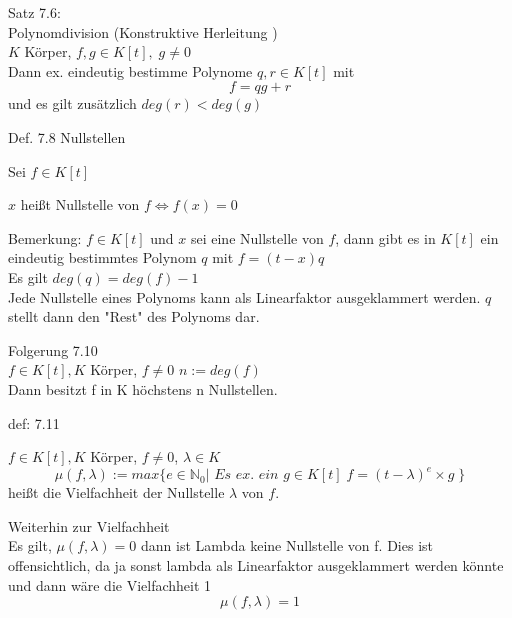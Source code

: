 \documentclass[headsepline,12pt,a4paper]{scrartcl}
\begin{document}
\item Satz 7.6: \\
Polynomdivision (Konstruktive Herleitung )\\
$K$ Körper, $f,g \in K[t], \; g \neq 0 $ \\
Dann ex. eindeutig bestimme Polynome $q,r \in K[t]$ mit \\

$$ f = qg+r $$ und es gilt zusätzlich $ deg(r) < deg(g) $  \\

\newpage

\begin{center}
\item[ Def. 7.8 Nullstellen]
\end{center}
\item Sei $f \in K[t]$  \\
\item $x$ heißt Nullstelle von $f \Leftrightarrow f(x)=0 $\\

\item Bemerkung:
$f \in K[t]$ und $x$ sei eine Nullstelle von $f$, dann gibt es in $K[t]$ ein eindeutig bestimmtes Polynom $q$ mit $f=(t-x)q$ \\
Es gilt $deg(q) = deg(f)-1$ \\

Jede Nullstelle eines Polynoms kann als Linearfaktor ausgeklammert werden. $q$ stellt dann den "Rest" des Polynoms dar. \\

\item Folgerung 7.10 \\
$f \in K[t],K$ Körper, $ f \neq 0 $   $ n := deg(f)$ \\

Dann besitzt f in K höchstens n Nullstellen.

\item[def: 7.11]
\item $f \in K[t],K$ Körper, $ f \neq 0 $, $\lambda \in K$ \\
$$\mu(f,\lambda):=max\{e \in \mathbb{N}_0 | \textit{ Es ex. ein } g \in K[t] \; f = (t-\lambda)^{e} \times g  \; \} $$ heißt die Vielfachheit der Nullstelle $\lambda $ von $f$.

\newpage

\item Weiterhin zur Vielfachheit \\
Es gilt, $\mu(f,\lambda) = 0$ dann ist Lambda keine Nullstelle von f. Dies ist offensichtlich, da ja sonst lambda als Linearfaktor ausgeklammert werden könnte und dann wäre die Vielfachheit 1 
$$\mu(f,\lambda) = 1 $$ 
\end{document}
